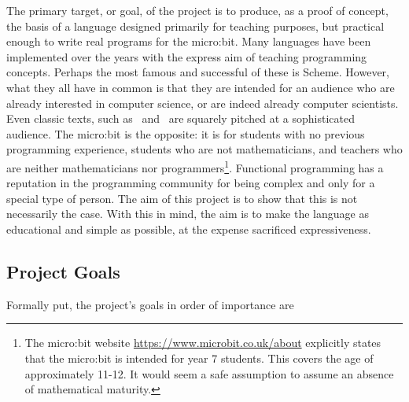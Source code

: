 \documentclass[12pt, a4paper]{report}
\begin{document}
The primary target, or goal, of the project is to produce, as a proof of concept, the basis of a
language designed primarily for teaching purposes, but practical enough to write real programs for
the micro:bit. Many languages have been implemented over the years with the express aim of teaching
programming concepts. Perhaps the most famous and successful of these is Scheme. However, what they
all have in common is that they are intended for an audience who are already interested in computer
science, or are indeed already computer scientists. Even classic texts, such
as~\cite{Abelson:1996:SIC:547755} and~\cite{Friedman1900} are squarely pitched at a sophisticated audience.
The micro:bit is the opposite: it is for students with no previous programming experience,
students who are not mathematicians, and teachers who are neither mathematicians nor
programmers\footnote{The micro:bit website \url{https://www.microbit.co.uk/about} explicitly states
that the micro:bit is intended for year 7 students. This covers the age of approximately 11-12. It
would seem a safe assumption to assume an absence of mathematical maturity.}.
Functional programming has a reputation in the programming community for being complex and only for a
special type of person. The aim of this project is to show that this is not necessarily the case.
With this in mind, the aim is to make the language as educational and simple as possible, at the expense 
sacrificed expressiveness. 

\subsection{Project Goals}
Formally put, the project's goals in order of importance are 
\end{document}

